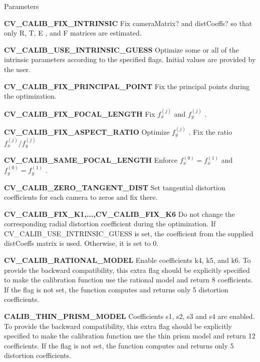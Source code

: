 \begin{DoxyParams}{Parameters}
\begin{DoxyItemize}
\item {\bfseries C\+V\+\_\+\+C\+A\+L\+I\+B\+\_\+\+F\+I\+X\+\_\+\+I\+N\+T\+R\+I\+N\+S\+IC} Fix camera\+Matrix? and dist\+Coeffs? so that only R, T, E , and F matrices are estimated.
\item {\bfseries C\+V\+\_\+\+C\+A\+L\+I\+B\+\_\+\+U\+S\+E\+\_\+\+I\+N\+T\+R\+I\+N\+S\+I\+C\+\_\+\+G\+U\+E\+SS} Optimize some or all of the intrinsic parameters according to the specified flags. Initial values are provided by the user.
\item {\bfseries C\+V\+\_\+\+C\+A\+L\+I\+B\+\_\+\+F\+I\+X\+\_\+\+P\+R\+I\+N\+C\+I\+P\+A\+L\+\_\+\+P\+O\+I\+NT} Fix the principal points during the optimization.
\item {\bfseries C\+V\+\_\+\+C\+A\+L\+I\+B\+\_\+\+F\+I\+X\+\_\+\+F\+O\+C\+A\+L\+\_\+\+L\+E\+N\+G\+TH} Fix $f^{(j)}_x$ and $f^{(j)}_y$ .
\item {\bfseries C\+V\+\_\+\+C\+A\+L\+I\+B\+\_\+\+F\+I\+X\+\_\+\+A\+S\+P\+E\+C\+T\+\_\+\+R\+A\+T\+IO} Optimize $f^{(j)}_y$ . Fix the ratio $f^{(j)}_x/f^{(j)}_y$
\end{DoxyItemize}
\begin{DoxyItemize}
\item {\bfseries C\+V\+\_\+\+C\+A\+L\+I\+B\+\_\+\+S\+A\+M\+E\+\_\+\+F\+O\+C\+A\+L\+\_\+\+L\+E\+N\+G\+TH} Enforce $f^{(0)}_x=f^{(1)}_x$ and $f^{(0)}_y=f^{(1)}_y$ .
\item {\bfseries C\+V\+\_\+\+C\+A\+L\+I\+B\+\_\+\+Z\+E\+R\+O\+\_\+\+T\+A\+N\+G\+E\+N\+T\+\_\+\+D\+I\+ST} Set tangential distortion coefficients for each camera to zeros and fix there.
\item {\bfseries C\+V\+\_\+\+C\+A\+L\+I\+B\+\_\+\+F\+I\+X\+\_\+\+K1,...,C\+V\+\_\+\+C\+A\+L\+I\+B\+\_\+\+F\+I\+X\+\_\+\+K6} Do not change the corresponding radial distortion coefficient during the optimization. If C\+V\+\_\+\+C\+A\+L\+I\+B\+\_\+\+U\+S\+E\+\_\+\+I\+N\+T\+R\+I\+N\+S\+I\+C\+\_\+\+G\+U\+E\+SS is set, the coefficient from the supplied dist\+Coeffs matrix is used. Otherwise, it is set to 0.
\item {\bfseries C\+V\+\_\+\+C\+A\+L\+I\+B\+\_\+\+R\+A\+T\+I\+O\+N\+A\+L\+\_\+\+M\+O\+D\+EL} Enable coefficients k4, k5, and k6. To provide the backward compatibility, this extra flag should be explicitly specified to make the calibration function use the rational model and return 8 coefficients. If the flag is not set, the function computes and returns only 5 distortion coefficients.
\item {\bfseries C\+A\+L\+I\+B\+\_\+\+T\+H\+I\+N\+\_\+\+P\+R\+I\+S\+M\+\_\+\+M\+O\+D\+EL} Coefficients s1, s2, s3 and s4 are enabled. To provide the backward compatibility, this extra flag should be explicitly specified to make the calibration function use the thin prism model and return 12 coefficients. If the flag is not set, the function computes and returns only 5 distortion coefficients.

\end{DoxyItemize}
\end{DoxyParams}
